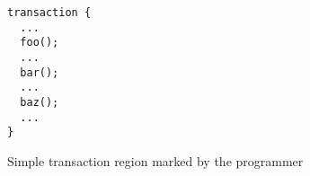 \begin{figure}[t]
\centering
\begin{minipage}{0.3\textwidth}%
\begin{lstlisting}[frame=single]
transaction {
  ...
  foo();
  ...
  bar();
  ...
  baz();
  ...
}
\end{lstlisting}
\end{minipage}
\caption{Simple transaction region marked by the programmer}
\label{fig:transaction-safety}
\end{figure}
